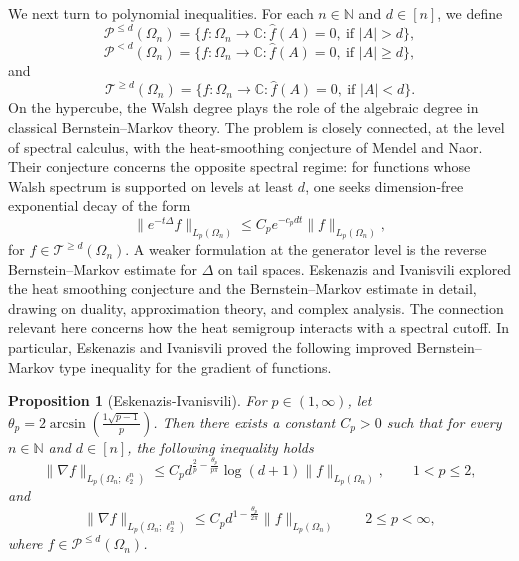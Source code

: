 \documentclass{amsart}
\numberwithin{equation}{section}
\newtheorem{prop}[thm]{Proposition}
\theoremstyle{definition}
\theoremstyle{remark}
\newcommand{\1}{\mathbf 1}
\begin{document}
We next turn to polynomial inequalities. For each $n\in \mathbb{N}$ and $d\in [n]$, we define
\[
\mathcal{P}^{\leq d}(\Omega_{n})=\{f:\Omega_{n}\to \mathbb{C}:\widehat{f}(A)=0,~\mbox{if }|A|>d\},
\]
\[
\mathcal{P}^{<d}(\Omega_{n})=\{f:\Omega_{n}\to \mathbb{C}:\widehat{f}(A)=0,~\mbox{if }|A|\geq d\},
\]
and
\[
\mathcal{T}^{\geq d}(\Omega_{n})=\{f:\Omega_{n}\to \mathbb{C}: \widehat{f}(A)=0,~\mbox{if }|A|< d\}.
\]
On the hypercube, the Walsh degree plays the role of the algebraic degree in classical Bernstein--Markov theory.  The problem is closely connected, at the level of spectral calculus, with the heat-smoothing conjecture of Mendel and Naor\cite{M-N2014}.  Their conjecture concerns the opposite spectral regime: for functions whose Walsh spectrum is supported on levels at least $d$, one seeks dimension-free exponential decay of the form
\[
\|e^{-t\Delta}f\|_{L_{p}(\Omega_{n})}\le C_p e^{-c_pdt}\|f\|_{L_{p}(\Omega_{n})},
\]
for $f\in \mathcal{T}^{\geq d}(\Omega_{n})$. A weaker formulation at the generator level is the reverse Bernstein--Markov estimate for $\Delta$ on tail spaces. Eskenazis and Ivanisvili \cite{E-I2020} explored the heat smoothing conjecture and the Bernstein--Markov estimate in detail, drawing on duality, approximation theory, and complex analysis. The connection relevant here concerns how the heat semigroup interacts with a spectral cutoff. In particular, Eskenazis and Ivanisvili \cite[Theorem 14]{E-I2020} proved the following improved Bernstein--Markov type inequality for the gradient of functions.


\begin{prop}[Eskenazis-Ivanisvili]
For $p\in(1,\infty)$, let $\theta_{p}=2\arcsin\left(\frac{1\sqrt{p-1}}{p}\right)$. Then there exists a constant $C_{p}>0$ such that for every $n\in \mathbb{N}$ and $d\in [n]$, the following inequality holds
\begin{equation}\label{additional log term}
\|\nabla f\|_{L_{p}(\Omega_{n};\ell^{n}_{2})}\leq C_{p}d^{\frac{2}{p}-\frac{\theta_{p}}{p\pi}}\log(d+1)\|f\|_{L_{p}(\Omega_{n})},\qquad 1<p\leq 2,
\end{equation}
and
\[
\|\nabla f\|_{L_{p}(\Omega_{n};\ell^{n}_{2})}\leq C_{p}d^{1-\frac{\theta_{p}}{2\pi}}\|f\|_{L_{p}(\Omega_{n})}\qquad 2\leq p<\infty,
\]
where $f\in\mathcal{P}^{\leq d}(\Omega_{n})$.
\end{prop}
\end{document}
